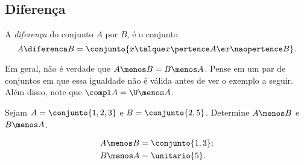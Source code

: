 \subsection{Diferença}

\begin{definition}
	\label{def:setminus}
	A \emph{diferença} do conjunto $A$ por $B$, é o conjunto
	\[
		A \diferenca B = \conjunto{ x \talque  x \pertence A \e x \naopertence B}.
	\]
\end{definition}

\begin{remark}
	Em geral, não é verdade que $A \menos B = B \menos A$. Pense em um par de conjuntos em que essa igualdade não é válida antes de ver o exemplo a seguir. Além disso, note que $\compl A = \U \menos A$.
\end{remark}

\begin{example}
	Sejam $A = \conjunto{1, 2, 3}$ e $ B = \conjunto{2,5}$. Determine $A \menos B$ e $B \menos A$.
\end{example}
	
\begin{solution}
	\begin{align*}
		&A \menos B = \conjunto{1,3};\\
		&B \menos A = \unitario{5}.
	\end{align*}
\end{solution}